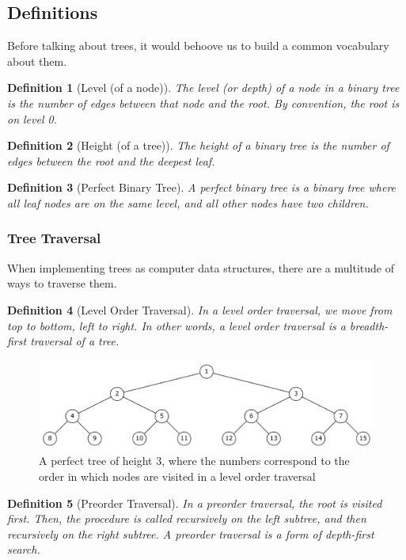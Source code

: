 \documentclass[11pt]{report}
\newtheorem{defn}{Definition}[section]
\begin{document}
\subsection{Definitions}
Before talking about trees, it would behoove us to build a common vocabulary about them.

\begin{defn}[Level (of a node)]
    The level (or depth) of a node in a binary tree is the number of edges between that node and the root. By convention, the root is on level 0.
\end{defn}

\begin{defn}[Height (of a tree)]
    The height of a binary tree is the number of edges between the root and the deepest leaf.
\end{defn}

\begin{defn}[Perfect Binary Tree]
    A perfect binary tree is a binary tree where all leaf nodes are on the same level, and all other nodes have two children.
\end{defn}

\subsubsection{Tree Traversal}
When implementing trees as computer data structures, there are a multitude of ways to traverse them.

\begin{defn}[Level Order Traversal]
    In a level order traversal, we move from top to bottom, left to right. In other words, a level order traversal is a breadth-first traversal of a tree.
\end{defn}

\begin{figure}[H]
    \includegraphics[width=\linewidth]{report/level_order.pdf}
    \caption{A perfect tree of height 3, where the numbers correspond to the order in which nodes are visited in a level order traversal}
\end{figure}

\begin{defn}[Preorder Traversal]
    In a preorder traversal, the root is visited first. Then, the procedure is called recursively on the left subtree, and then recursively on the right subtree. A preorder traversal is a form of depth-first search.
\end{defn}
\end{document}
